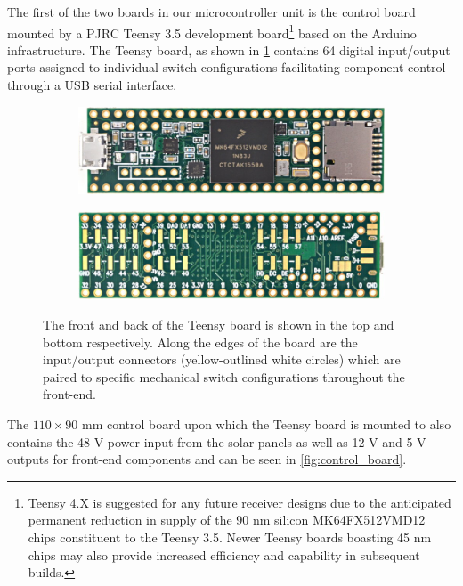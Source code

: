 The first of the two boards in our microcontroller unit is the control board mounted by a PJRC Teensy 3.5 development board\footnote{Teensy 4.X is suggested for any future receiver designs due to the anticipated permanent reduction in supply of the 90 nm silicon MK64FX512VMD12 chips constituent to the Teensy 3.5. Newer Teensy boards boasting 45 nm chips may also provide increased efficiency and capability in subsequent builds.} based on the Arduino infrastructure. The Teensy board, as shown in \cref{fig:teensy} contains 64 digital input/output ports assigned to individual switch configurations facilitating component control through a USB serial interface.
\begin{figure}
    \centering
    \begin{subfigure}{0.5\textwidth}
        \includegraphics[width=\textwidth]{teensy_top}
    \end{subfigure}
    \begin{subfigure}{0.5\textwidth}
        \includegraphics[width=\textwidth]{teensy_bottom}
    \end{subfigure}
    \caption{The front and back of the Teensy board is shown in the top and bottom respectively. Along the edges of the board are the input/output connectors (yellow-outlined white circles) which are paired to specific mechanical switch configurations throughout the front-end.}
    \label{fig:teensy}
\end{figure}
The $110 \times 90$ mm control board upon which the Teensy board is mounted to also contains the 48 V power input from the solar panels as well as 12 V and 5 V outputs for front-end components and can be seen in \cref{fig:control_board}.
